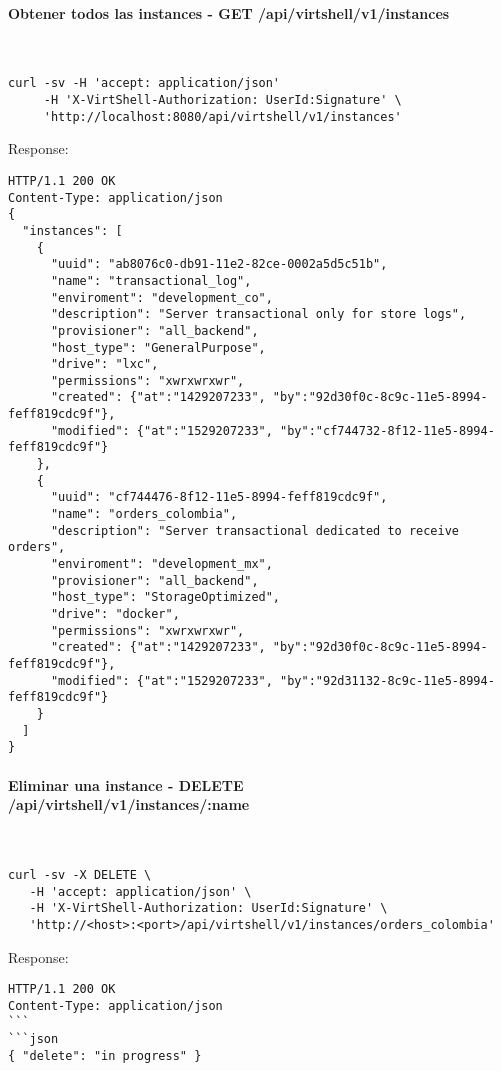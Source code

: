 \paragraph{Obtener todos las instances - GET /api/virtshell/v1/instances} ~\\

\begin{lstlisting}[style=json]
curl -sv -H 'accept: application/json' 
     -H 'X-VirtShell-Authorization: UserId:Signature' \ 
     'http://localhost:8080/api/virtshell/v1/instances'
\end{lstlisting}

Response:

\begin{lstlisting}[style=json]
HTTP/1.1 200 OK
Content-Type: application/json
{
  "instances": [
    {
      "uuid": "ab8076c0-db91-11e2-82ce-0002a5d5c51b",
      "name": "transactional_log",
      "enviroment": "development_co",
      "description": "Server transactional only for store logs", 
      "provisioner": "all_backend",
      "host_type": "GeneralPurpose",
      "drive": "lxc",
      "permissions": "xwrxwrxwr",
      "created": {"at":"1429207233", "by":"92d30f0c-8c9c-11e5-8994-feff819cdc9f"},
      "modified": {"at":"1529207233", "by":"cf744732-8f12-11e5-8994-feff819cdc9f"}
    },
    { 
      "uuid": "cf744476-8f12-11e5-8994-feff819cdc9f",
      "name": "orders_colombia",
      "description": "Server transactional dedicated to receive orders", 
      "enviroment": "development_mx",
      "provisioner": "all_backend",
      "host_type": "StorageOptimized",
      "drive": "docker",
      "permissions": "xwrxwrxwr",
      "created": {"at":"1429207233", "by":"92d30f0c-8c9c-11e5-8994-feff819cdc9f"},
      "modified": {"at":"1529207233", "by":"92d31132-8c9c-11e5-8994-feff819cdc9f"}
    }    
  ]
} 
\end{lstlisting}

\paragraph{Eliminar una instance - DELETE \\ /api/virtshell/v1/instances/:name} ~\\

\begin{lstlisting}[style=json]
curl -sv -X DELETE \
   -H 'accept: application/json' \
   -H 'X-VirtShell-Authorization: UserId:Signature' \
   'http://<host>:<port>/api/virtshell/v1/instances/orders_colombia'
\end{lstlisting}

Response:

\begin{lstlisting}[style=json]
HTTP/1.1 200 OK
Content-Type: application/json
```
```json
{ "delete": "in progress" }
\end{lstlisting}